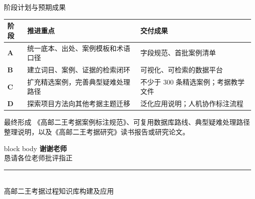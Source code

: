 \documentclass[aspectratio=169]{beamer}
\begin{document}
\begin{frame}{阶段计划与预期成果}
    \small
    \begin{table}[h]
        \centering
        \setlength{\tabcolsep}{4pt}
        \renewcommand{\arraystretch}{1.08}
        \begin{tabularx}{\textwidth}{>{\bfseries}l X X}
            \toprule
            阶段 & 推进重点 & 交付成果 \\
            \midrule
            A & 统一底本、出处、案例模板和术语口径 & 字段规范、首批案例清单 \\
            B & 建立词目、案例、证据的检索闭环 & 可视化、可检索的数据平台 \\
            C & 扩充精选案例，完善典型疑难处理路径 & 不少于 300 条精选案例；考据教学文件 \\
            D & 探索项目方法向其他考据主题迁移 & 泛化应用说明；人机协作标注流程 \\
            \bottomrule
        \end{tabularx}
    \end{table}
    \begin{block}{最终形成}
        《高邮二王考据案例标注规范》、可复用数据库路线、典型疑难处理路径整理说明，以及《高邮二王考据研究》读书报告或研究论文。
    \end{block}
\end{frame}

\begin{frame}[plain]
    \vspace{0.95cm}
    \begin{center}
        \begin{beamercolorbox}[wd=0.72\textwidth,sep=0.55cm,center,rounded=true,shadow=true]{block body}
            {\Huge\textcolor{rucRed}{\textbf{谢谢老师}}}\\[0.38cm]
            {\Large 恳请各位老师批评指正}\\[0.36cm]
            \textcolor{rucRed}{\rule{0.42\linewidth}{0.6pt}}\\[0.28cm]
            {\small 高邮二王考据过程知识库构建及应用}
        \end{beamercolorbox}
    \end{center}
\end{frame}
\end{document}
